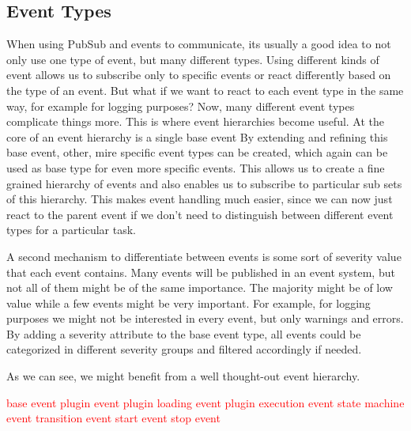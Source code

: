 \subsection{Event Types}

When using PubSub and events to communicate, its usually a good idea to not only use one type of event, but many different types.
Using different kinds of event allows us to subscribe only to specific events or react differently based on the type of an event.
But what if we want to react to each event type in the same way, for example for logging purposes?
Now, many different event types complicate things more.
This is where event hierarchies become useful.
At the core of an event hierarchy is a single base event
By extending and refining this base event, other, mire specific event types can be created, which again can be used as base type for even more specific events.
This allows us to create a fine grained hierarchy of events and also enables us to subscribe to particular sub sets of this hierarchy.
This makes event handling much easier, since we can now just react to the parent event if we don't need to distinguish between different event types for a particular task.

A second mechanism to differentiate between events is some sort of severity value that each event contains.
Many events will be published in an event system, but not all of them might be of the same importance.
The majority might be of low value while a few events might be very important.
For example, for logging purposes we might not be interested in every event, but only warnings and errors.
By adding a severity attribute to the base event type, all events could be categorized in different severity groups and filtered accordingly if needed.

As we can see, we might benefit from a well thought-out event hierarchy.

\textcolor{red}{
base event
	plugin event
		plugin loading event
		plugin execution event
	state machine event
		transition event
		start event
		stop event
}
